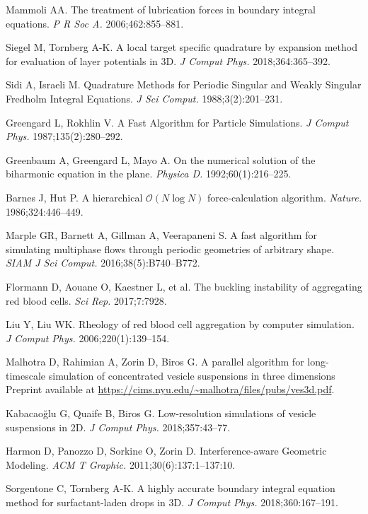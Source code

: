\documentclass[AMA,STIX1COL]{WileyNJD-v2}
\begin{document}
\begin{thebibliography}{10}
Mammoli AA. The treatment of lubrication forces in boundary integral equations.
   {\it P R Soc A. }2006;462:855--881.

Siegel M, Tornberg A-K. {A local target specific quadrature by expansion method
  for evaluation of layer potentials in 3D}.  {\it J Comput Phys.
  }2018;364:365--392.

Sidi A, Israeli M. Quadrature {M}ethods for {P}eriodic {S}ingular and {W}eakly
  {S}ingular {F}redholm {I}ntegral {E}quations.  {\it J Sci Comput.
  }1988;3(2):201--231.

Greengard L, Rokhlin V. {A Fast Algorithm for Particle Simulations}.  {\it J
  Comput Phys. }1987;135(2):280--292.

Greenbaum A, Greengard L, Mayo A. On the numerical solution of the biharmonic
  equation in the plane.  {\it Physica D. }1992;60(1):216--225.

Barnes J, Hut P. {A hierarchical $\mathcal{O}(N \log N)$ force-calculation
  algorithm}.  {\it Nature. }1986;324:446--449.

Marple GR, Barnett A, Gillman A, Veerapaneni S. A fast algorithm for simulating
  multiphase flows through periodic geometries of arbitrary shape.  {\it SIAM J
  Sci Comput. }2016;38(5):B740--B772.

Flormann D, Aouane O, Kaestner L, et al. The buckling instability of
  aggregating red blood cells.  {\it Sci Rep. }2017;7:7928.

Liu Y, Liu WK. {Rheology of red blood cell aggregation by computer simulation}.
   {\it J Comput Phys. }2006;220(1):139--154.

Malhotra D, Rahimian A, Zorin D, Biros G. {A parallel algorithm for
  long-timescale simulation of concentrated vesicle suspensions in three
  dimensions}  Preprint available at
  \url{https://cims.nyu.edu/~malhotra/files/pubs/ves3d.pdf}.

Kabacao\u{g}lu G, Quaife B, Biros G. {Low-resolution simulations of vesicle
  suspensions in 2D}.  {\it J Comput Phys. }2018;357:43--77.

Harmon D, Panozzo D, Sorkine O, Zorin D. {Interference-aware Geometric
  Modeling}.  {\it ACM T Graphic. }2011;30(6):137:1--137:10.

Sorgentone C, Tornberg A-K. {A highly accurate boundary integral equation
  method for surfactant-laden drops in 3D}.  {\it J Comput Phys.
  }2018;360:167--191.


\end{thebibliography}
\end{document}
